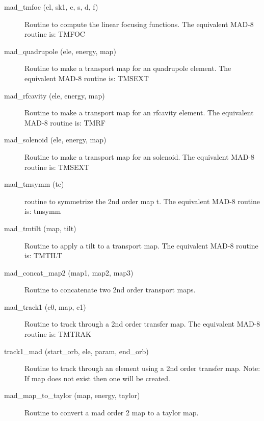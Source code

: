 \begin{description}
\label{r:mad.tmfoc}
\item[mad_tmfoc (el, sk1, c, s, d, f)] \Newline 
     Routine to compute the linear focusing functions.  
     The equivalent MAD-8 routine is: TMFOC

\label{r:mad.quadrupole}
\item[mad_quadrupole (ele, energy, map)] \Newline 
     Routine to make a transport map for an quadrupole element.
     The equivalent MAD-8 routine is: TMSEXT

\label{r:mad.rfcavity}
\item[mad_rfcavity (ele, energy, map)] \Newline 
     Routine to make a transport map for an rfcavity element.
     The equivalent MAD-8 routine is: TMRF

\label{r:mad.solenoid}
\item[mad_solenoid (ele, energy, map)] \Newline 
     Routine to make a transport map for an solenoid.
     The equivalent MAD-8 routine is: TMSEXT

\label{r:mad.tmsymm}
\item[mad_tmsymm (te)] \Newline 
     routine to symmetrize the 2nd order map t.
     The equivalent MAD-8 routine is: tmsymm

\label{r:mad.tmtilt}
\item[mad_tmtilt (map, tilt)] \Newline 
     Routine to apply a tilt to a transport map.
     The equivalent MAD-8 routine is: TMTILT

\label{r:mad.concat.map2}
\item[mad_concat_map2 (map1, map2, map3)] \Newline 
     Routine to concatenate two 2nd order transport maps.

\label{r:mad.track1}
\item[mad_track1 (c0, map, c1)] \Newline 
     Routine to track through a 2nd order transfer map.
     The equivalent MAD-8 routine is: TMTRAK

\label{r:track1.mad}
\item[track1_mad (start_orb, ele, param, end_orb)] \Newline 
     Routine to track through an element using a 2nd order transfer map.
     Note: If map does not exist then one will be created. 

\label{r:mad.map.to.taylor}
\item[mad_map_to_taylor (map, energy, taylor)] \Newline 
     Routine to convert a mad order 2 map to a taylor map.


\end{description}
